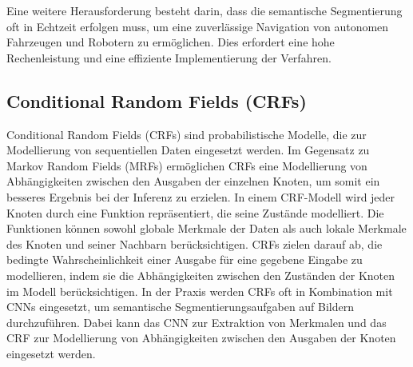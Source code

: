 Eine weitere Herausforderung besteht darin, dass die semantische Segmentierung
oft in Echtzeit erfolgen muss, um eine zuverlässige Navigation von autonomen
Fahrzeugen und Robotern zu ermöglichen. Dies erfordert eine hohe Rechenleistung
und eine effiziente Implementierung der Verfahren.


\subsection{Conditional Random Fields (CRFs)}
Conditional Random Fields (CRFs) sind probabilistische Modelle, die zur
Modellierung von sequentiellen Daten eingesetzt werden. Im Gegensatz zu Markov
Random Fields (MRFs) ermöglichen CRFs eine Modellierung von Abhängigkeiten
zwischen den Ausgaben der einzelnen Knoten, um somit ein besseres Ergebnis bei
der Inferenz zu erzielen. In einem CRF-Modell wird jeder Knoten durch eine
Funktion repräsentiert, die seine Zustände modelliert. Die Funktionen können
sowohl globale Merkmale der Daten als auch lokale Merkmale des Knoten und
seiner Nachbarn berücksichtigen. CRFs zielen darauf ab, die bedingte
Wahrscheinlichkeit einer Ausgabe für eine gegebene Eingabe zu modellieren,
indem sie die Abhängigkeiten zwischen den Zuständen der Knoten im Modell
berücksichtigen. In der Praxis werden CRFs oft in Kombination mit CNNs
eingesetzt, um semantische Segmentierungsaufgaben auf Bildern durchzuführen.
Dabei kann das CNN zur Extraktion von Merkmalen und das CRF zur Modellierung
von Abhängigkeiten zwischen den Ausgaben der Knoten eingesetzt werden.
